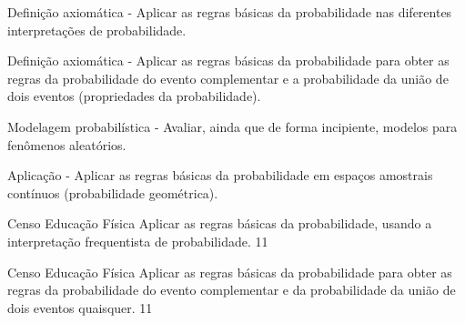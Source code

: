 \begin{paginatexto}
{\begin{OES}\setcounter{enumi}{5}
\item Definição axiomática - Aplicar as regras básicas da probabilidade nas diferentes interpretações de probabilidade.
\item Definição axiomática - Aplicar as regras básicas da probabilidade para obter as regras da probabilidade do evento complementar e a probabilidade da união de dois eventos (propriedades da probabilidade).
\item Modelagem probabilística - Avaliar, ainda que de forma incipiente, modelos para fenômenos aleatórios.
\item Aplicação - Aplicar as regras básicas da probabilidade em espaços amostrais contínuos (probabilidade geométrica).
\end{OES}
}
\end{paginatexto}
\begin{objectives}{Censo Educação Física}
{
Aplicar as regras básicas da probabilidade, usando a interpretação frequentista de probabilidade.
}{1}{1}
\end{objectives}
\begin{sugestions}{Censo Educação Física}
{
Aplicar as regras básicas da probabilidade para obter as regras da probabilidade do evento complementar e da probabilidade da união de dois eventos quaisquer.
}{1}{1}
\end{sugestions}
\clearmargin
